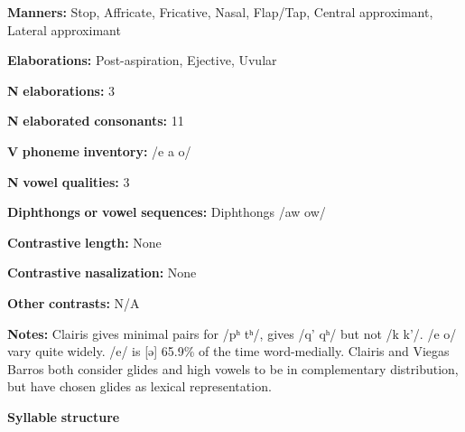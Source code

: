 \documentclass[output=paper]{langsci/langscibook}
\begin{document}
\begin{styleBody}
\textbf{Manners:} Stop, Affricate, Fricative, Nasal, Flap/Tap, Central approximant, Lateral approximant
\end{styleBody}

\begin{styleBody}
\textbf{Elaborations:} Post-aspiration, Ejective, Uvular
\end{styleBody}

\begin{styleBody}
\textbf{N} \textbf{elaborations:} 3
\end{styleBody}

\begin{styleBody}
\textbf{N} \textbf{elaborated} \textbf{consonants:} 11
\end{styleBody}

\begin{styleBody}
\textbf{V} \textbf{phoneme} \textbf{inventory:} /e a o/
\end{styleBody}

\begin{styleBody}
\textbf{N} \textbf{vowel} \textbf{qualities:} 3
\end{styleBody}

\begin{styleBody}
\textbf{Diphthongs} \textbf{or} \textbf{vowel} \textbf{sequences:} Diphthongs /aw ow/
\end{styleBody}

\begin{styleBody}
\textbf{Contrastive} \textbf{length:} None
\end{styleBody}

\begin{styleBody}
\textbf{Contrastive} \textbf{nasalization:} None
\end{styleBody}

\begin{styleBody}
\textbf{Other} \textbf{contrasts:} N/A
\end{styleBody}

\begin{styleBody}
\textbf{Notes:} Clairis gives minimal pairs for /pʰ tʰ/, gives /q’ qʰ/ but not /k k’/. /e o/ vary quite widely. /e/ is [ə] 65.9\% of the time word-medially. Clairis and Viegas Barros both consider glides and high vowels to be in complementary distribution, but have chosen glides as lexical representation.
\end{styleBody}

\begin{styleBody}
\textbf{Syllable} \textbf{structure}
\end{styleBody}
\end{document}

